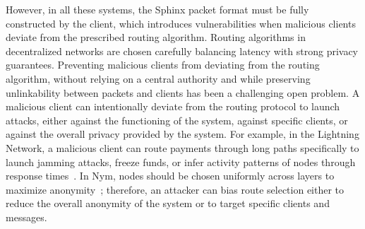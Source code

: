 However, in all these systems, the Sphinx packet format must be fully constructed by the client, which introduces vulnerabilities when malicious clients deviate from the prescribed routing algorithm. 
Routing algorithms in decentralized networks are chosen carefully balancing latency with strong privacy guarantees. Preventing malicious clients from deviating from the routing algorithm, without relying on a central authority and while preserving unlinkability between packets and clients has been a challenging open problem. A malicious client can intentionally deviate from the routing protocol to launch attacks, either against the functioning of the system, against specific clients, or against the overall privacy provided by the system. For example, in the Lightning Network, a malicious client can route payments through long paths specifically to launch jamming attacks, freeze funds, or infer activity patterns of nodes through response times~\cite{Rohrer2019paymentchannels,kappos2021empirical}. In Nym, nodes should be chosen uniformly across layers to maximize anonymity~\cite{benguirat2022mixnet}; therefore, an attacker can bias route selection either to reduce the overall anonymity of the system or to target specific clients and messages.

